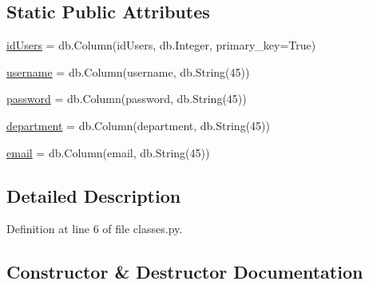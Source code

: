 \subsection*{Static Public Attributes}
\begin{DoxyCompactItemize}
\item 
\hyperlink{class_web_content_1_1classes_1_1users_ac626a21b539eab7dfd3170533ff98fad}{id\+Users} = db.\+Column(\textquotesingle{}id\+Users\textquotesingle{}, db.\+Integer, primary\+\_\+key=True)
\item 
\hyperlink{class_web_content_1_1classes_1_1users_afb64ef703cb89d0c372007783ca92878}{username} = db.\+Column(\textquotesingle{}username\textquotesingle{}, db.\+String(45))
\item 
\hyperlink{class_web_content_1_1classes_1_1users_a872abe3f6d9eea4f7297bff086678579}{password} = db.\+Column(\textquotesingle{}password\textquotesingle{}, db.\+String(45))
\item 
\hyperlink{class_web_content_1_1classes_1_1users_afd71cf2bea8a6b8fd393fd651f2448cc}{department} = db.\+Column(\textquotesingle{}department\textquotesingle{}, db.\+String(45))
\item 
\hyperlink{class_web_content_1_1classes_1_1users_aa30c070613e830426f817c9a999b351e}{email} = db.\+Column(\textquotesingle{}email\textquotesingle{}, db.\+String(45))
\end{DoxyCompactItemize}


\subsection{Detailed Description}


Definition at line 6 of file classes.\+py.



\subsection{Constructor \& Destructor Documentation}
\mbox{\label{class_web_content_1_1classes_1_1users_ad5964e00cfc6f7b41c3309c7679166dc}} 

